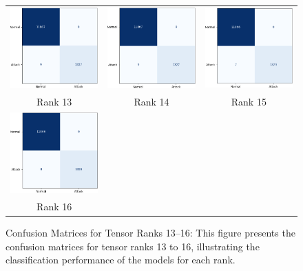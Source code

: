 \documentclass[pdflatex,sn-mathphys-num]{sn-jnl}
\theoremstyle{thmstyleone}
\theoremstyle{thmstyletwo}
\theoremstyle{thmstylethree}
\begin{document}
\begin{figure}[H]
    \centering
    \begin{tabular}{ccc}
        \includegraphics[width=0.3\linewidth]{rank_13.png} &
        \includegraphics[width=0.3\linewidth]{rank_14.png} &
        \includegraphics[width=0.3\linewidth]{rank_15.png} \\
        \small Rank 13 & \small Rank 14 & \small Rank 15 \\[6pt]

        \includegraphics[width=0.3\linewidth]{rank_16.png} & & \\
        \small Rank 16 & & 
    \end{tabular}
    \caption{Confusion Matrices for Tensor Ranks 13–16: This figure presents the confusion matrices for tensor ranks 13 to 16, illustrating the classification performance of the models for each rank.}
    \label{fig:confusion_matrices_3}
\end{figure}
\end{document}
